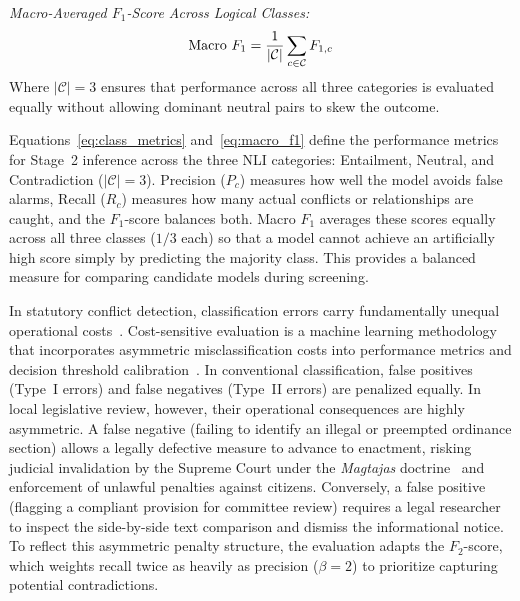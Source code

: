     \noindent\textit{Macro-Averaged $F_1$-Score Across Logical Classes:}
    \begin{equation}
        \text{Macro } F_1 = \frac{1}{|\mathcal{C}|} \sum_{c \in \mathcal{C}} F_{1,c}
        \label{eq:macro_f1}
        \eqcaption{Macro-Averaged $F_1$-Score Across Logical Classes}
    \end{equation}
    \noindent Where $|\mathcal{C}| = 3$ ensures that performance across all three categories is evaluated equally without allowing dominant neutral pairs to skew the outcome.

    Equations~\ref{eq:class_metrics} and~\ref{eq:macro_f1} define the performance metrics for Stage~2 inference across the three NLI categories: Entailment, Neutral, and Contradiction ($|\mathcal{C}| = 3$). Precision ($P_c$) measures how well the model avoids false alarms, Recall ($R_c$) measures how many actual conflicts or relationships are caught, and the $F_1$-score balances both. Macro $F_1$ averages these scores equally across all three classes ($1/3$ each) so that a model cannot achieve an artificially high score simply by predicting the majority class. This provides a balanced measure for comparing candidate models during screening.

    In statutory conflict detection, classification errors carry fundamentally unequal operational costs~\cite{elkan2001foundations, fawcett2006roc}. Cost-sensitive evaluation is a machine learning methodology that incorporates asymmetric misclassification costs into performance metrics and decision threshold calibration~\cite{elkan2001foundations}. In conventional classification, false positives (Type~I errors) and false negatives (Type~II errors) are penalized equally. In local legislative review, however, their operational consequences are highly asymmetric. A false negative (failing to identify an illegal or preempted ordinance section) allows a legally defective measure to advance to enactment, risking judicial invalidation by the Supreme Court under the \textit{Magtajas} doctrine~\cite{scp1994magtajasvpryce} and enforcement of unlawful penalties against citizens. Conversely, a false positive (flagging a compliant provision for committee review) requires a legal researcher to inspect the side-by-side text comparison and dismiss the informational notice. To reflect this asymmetric penalty structure, the evaluation adapts the $F_2$-score, which weights recall twice as heavily as precision ($\beta = 2$) to prioritize capturing potential contradictions.

